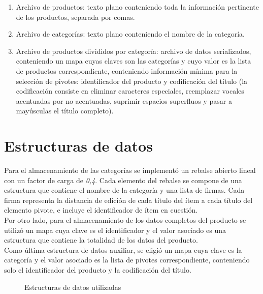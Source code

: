 \begin{enumerate}[1.]
\item  Archivo de productos: texto plano conteniendo toda la informaci\'on pertinente de los productos, separada por comas.
\item  Archivo de categor\'ias: texto plano conteniendo el nombre de la categor\'ia.
\item  Archivo de productos divididos por categor\'ia: archivo de datos serializados, conteniendo un mapa cuyas claves son las categor\'ias y cuyo valor es la lista de productos correspondiente, conteniendo informaci\'on m\'inima para la selecci\'on de pivotes: identificador del producto y codificaci\'on del t\'itulo (la codificaci\'on consiste en eliminar caracteres especiales, reemplazar vocales acentuadas por no acentuadas, suprimir espacios superfluos y pasar a may\'usculas el t\'itulo completo).
\end{enumerate}

\section{Estructuras de datos}

Para el almacenamiento de las categor\'ias se implement\'o un rebalse abierto lineal con un factor de carga de \textit{0,4}. Cada elemento del rebalse se compone de una estructura que contiene el nombre de la categor\'ia y una lista de firmas. Cada firma representa la distancia de edici\'on de cada t\'itulo del \'item a cada t\'itulo del elemento pivote, e incluye el identificador de \'item en cuesti\'on.\\

Por otro lado, para el almacenamiento de los datos completos del producto se utiliz\'o un mapa cuya clave es el identificador y el valor asociado es una estructura que contiene la totalidad de los datos del producto.\\

Como \'ultima estructura de datos auxiliar, se eligi\'o un mapa cuya clave es la categor\'ia y el valor asociado es la lista de pivotes correspondiente, conteniendo solo el identificador del producto y la codificaci\'on del t\'itulo.\\

\begin{figure}[H]
\centering
{}
		\caption{\small Estructuras de datos utilizadas}
		\label{fig:estructuras}
\end{figure}

